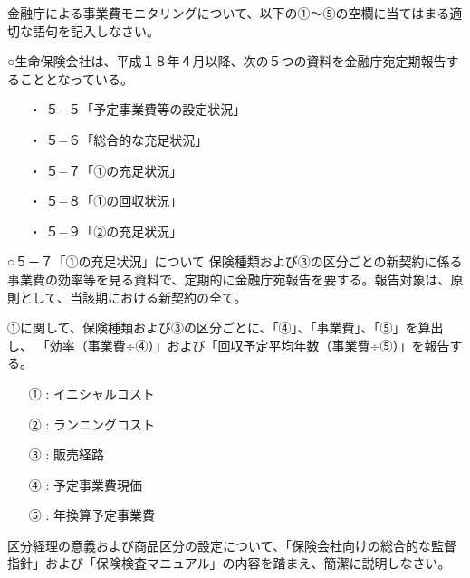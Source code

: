 \documentclass[report,gutter=10mm,fore-edge=10mm,uplatex,dvipdfmx]{jlreq}
\begin{document}
金融庁による事業費モニタリングについて、以下の①〜⑤の空欄に当てはまる適切な語句を記入しなさい。

○生命保険会社は、平成１８年４月以降、次の５つの資料を金融庁宛定期報告することとなっている。
\begin{itemize}
\item[ ・]  ５−５「予定事業費等の設定状況」
\item[ ・]  ５−６「総合的な充足状況」
\item[ ・]  ５−７「①の充足状況」
\item[ ・]  ５−８「①の回収状況」
\item[ ・]  ５−９「②の充足状況」
\end{itemize}

○５－７「①の充足状況」について
保険種類および③の区分ごとの新契約に係る事業費の効率等を見る資料で、定期的に金融庁宛報告を要する。報告対象は、原則として、当該期における新契約の全て。

①に関して、保険種類および③の区分ごとに、「④」、「事業費」、「⑤」を算出し、
「効率（事業費÷④）」および「回収予定平均年数（事業費÷⑤）」を報告する。

\begin{itemize}
\item[① : ] イニシャルコスト
\item[② : ] ランニングコスト
\item[③ : ] 販売経路
\item[④ : ] 予定事業費現価
\item[⑤ : ] 年換算予定事業費
\end{itemize}

区分経理の意義および商品区分の設定について、「保険会社向けの総合的な監督指針」および「保険検査マニュアル」の内容を踏まえ、簡潔に説明しなさい。

\answer{}
\end{document}
